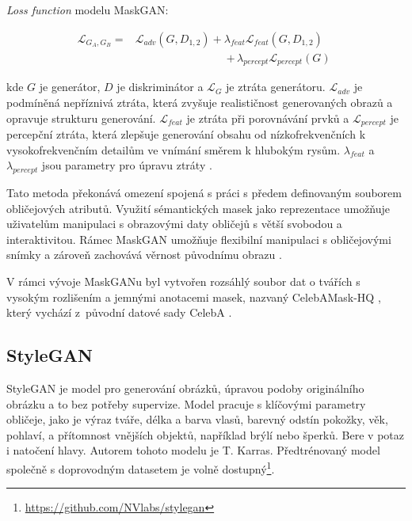 \noindent \textit{Loss function} modelu MaskGAN:

\begin{align}
    \mathcal{L}_{G_{A},G_{B}} =& \mathcal{L}_{adv} (G,D_{1,2})+\lambda _{feat} \mathcal{L}_{feat} (G,D_{1,2}) \\&~ \qquad \qquad \qquad \qquad
    {+\,\lambda _{percept} \mathcal{L}_{percept} (G)\,\,}
    \label{eq:MaskGANObj}
\end{align}

kde $G$ je generátor, $D$ je diskriminátor a $\mathcal{L}_G$ je ztráta generátoru. $\mathcal{L}_{adv}$ je podmíněná nepříznivá ztráta, která zvyšuje realističnost generovaných obrazů a opravuje strukturu generování. $\mathcal{L}_{feat}$ je ztráta při porovnávání prvků a $\mathcal{L}_{percept}$ je percepční ztráta, která zlepšuje generování obsahu od nízkofrekvenčních k vysokofrekvenčním detailům ve vnímání směrem k hlubokým rysům. $\lambda _{feat}$ a $\lambda _{percept}$ jsou parametry pro úpravu ztráty \cite{CelebAMask-HQ}.

\bigskip

\noindent Tato metoda překonává omezení spojená s práci s předem definovaným souborem obličejových atributů. Využití sémantických masek jako reprezentace umožňuje uživatelům manipulaci s obrazovými daty obličejů s větší svobodou a interaktivitou. Rámec MaskGAN umožňuje flexibilní manipulaci s obličejovými snímky a zároveň zachovává věrnost původnímu obrazu \cite{reviewGANs}.

V rámci vývoje MaskGANu byl vytvořen rozsáhlý soubor dat o tvářích s vysokým rozlišením a jemnými anotacemi masek, nazvaný CelebAMask-HQ \cite{CelebAMask-HQ}, který vychází z~původní datové sady CelebA \cite{CelebADataset}.

\newpage

\subsection*{StyleGAN}

StyleGAN \cite{KarrasStyleGAN} je model pro generování obrázků, úpravou podoby originálního obrázku a to bez potřeby supervize. Model pracuje s klíčovými parametry obličeje, jako je výraz tváře, délka a barva vlasů, barevný odstín pokožky, věk, pohlaví, a přítomnost vnějších objektů, například brýlí nebo šperků. Bere v potaz i natočení hlavy. Autorem tohoto modelu je T. Karras. Předtrénovaný model společně s doprovodným datasetem je volně dostupný\footnote{\url{https://github.com/NVlabs/stylegan}}.

